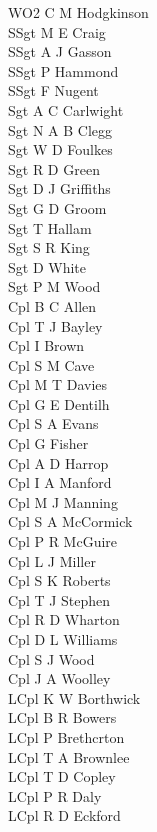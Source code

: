 \begin{multicols}{2}
  \noindent
  WO2 C M Hodgkinson \\
  SSgt M E Craig \\
  SSgt A J Gasson \\
  SSgt P Hammond \\
  SSgt F Nugent \\
  Sgt A C Carlwight \\
  Sgt N A B Clegg \\
  Sgt W D Foulkes \\
  Sgt R D Green \\
  Sgt D J Griffiths \\
  Sgt G D Groom \\
  Sgt T Hallam \\
  Sgt S R King \\
  Sgt D White \\
  Sgt P M Wood \\
  Cpl B C Allen \\
  Cpl T J Bayley \\
  Cpl I Brown \\
  Cpl S M Cave \\
  Cpl M T Davies \\
  Cpl G E Dentilh \\
  Cpl S A Evans \\
  Cpl G Fisher \\
  Cpl A D Harrop \\
  Cpl I A Manford \\
  Cpl M J Manning \\
  Cpl S A McCormick \\
  Cpl P R McGuire \\
  Cpl L J Miller \\
  Cpl S K Roberts \\
  Cpl T J Stephen \\
  Cpl R D Wharton \\
  Cpl D L Williams \\
  Cpl S J Wood \\
  Cpl J A Woolley \\
  LCpl K W Borthwick \\
  LCpl B R Bowers \\
  LCpl P Brethcrton \\
  LCpl T A Brownlee \\
  LCpl T D Copley \\
  LCpl P R Daly \\
  LCpl R D Eckford \\

\end{multicols}
